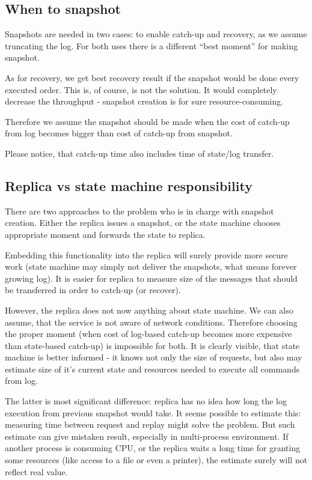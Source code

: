 \subsection{When to snapshot}
\label{subsec:When_to_snapshot}
Snapshots are needed in two cases: to enable catch-up and recovery, as we assume truncating the log. For both uses there is a different ``best moment'' for making snapshot.

As for recovery, we get best recovery result if the snapshot would be done every executed order.
This is, of course, is not the solution. It would completely decrease the throughput - snapshot creation is for sure resource-consuming.

Therefore we assume the snapshot should be made when the cost of catch-up from log becomes bigger than cost of catch-up from snapshot.

Please notice, that catch-up time also includes time of state/log transfer.

\subsection{Replica vs state machine responsibility}
\label{subsec:Replica_vs_state_machine_responsibility}
There are two approaches to the problem who is in charge with snapshot creation. Either the replica issues a snapshot, or the state machine chooses appropriate moment and forwards the state to replica.

Embedding this functionality into the replica will surely provide more secure work (state machine may simply not deliver the snapshots, what means forever growing log). It is easier for replica to measure size of the messages that should be transferred in order to catch-up (or recover).

However, the replica does not now anything about state machine. We can also assume, that the service is not aware of network conditions. Therefore choosing the proper moment (when cost of log-based catch-up becomes more expensive than state-based catch-up) is impossible for both. It is clearly visible, that state machine is better informed - it knows not only the size of requests, but also may estimate size of it's current state and resources needed to execute all commands from log.

The latter is most significant difference: replica has no idea how long the log execution from previous snapshot would take. It seems possible to estimate this: measuring time between request and replay might solve the problem. But such estimate can give mistaken result, especially in multi-process environment. If another process is consuming CPU, or the replica waits a long time for granting some resources (like access to a file or even a printer), the estimate surely will not reflect real value.

